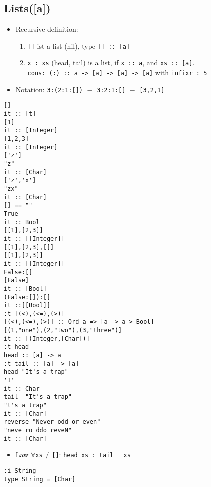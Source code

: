 \documentclass{article}
\newcommand{\Haskell}[1]{\texttt{#1}}
\begin{document}
\begin{enumerate}
\end{enumerate}
\subsection{Lists([a])}
\begin{itemize}
\item Recursive definition:
\begin{enumerate}
\item\Haskell{[]} ist a list (nil), type \Haskell{[] :: [a]}
\item\Haskell{x : xs} (head, tail) is a list, if \Haskell{x :: a}, and \Haskell{xs :: [a]}.\\
\phantom{ }\quad \Haskell{cons: (:) :: a -> [a] -> [a] -> [a]} with \Haskell{infixr : 5}
\end{enumerate}
\item Notation: \Haskell{3:(2:1:[])} $\equiv$ \Haskell{3:2:1:[]} $\equiv$ \Haskell{[3,2,1]}
\end{itemize}
\begin{verbatim}
[]
it :: [t]
[1]
it :: [Integer]
[1,2,3]
it :: [Integer]
['z']
"z"
it :: [Char]
['z','x']
"zx"
it :: [Char]
[] == ""
True
it :: Bool
[[1],[2,3]]
it :: [[Integer]]
[[1],[2,3],[]]
[[1],[2,3]]
it :: [[Integer]]
False:[]
[False]
it :: [Bool]
(False:[]):[]
it ::[[Bool]]
:t [(<),(<=),(>)]
[(<),(<=),(>)] :: Ord a => [a -> a-> Bool]
[(1,"one"),(2,"two"),(3,"three")]
it :: [(Integer,[Char])]
:t head
head :: [a] -> a
:t tail :: [a] -> [a]
head "It's a trap"
'I'
it :: Char
tail  "It's a trap"
"t's a trap"
it :: [Char]
reverse "Never odd or even"
"neve ro ddo reveN"
it :: [Char]
\end{verbatim}
\begin{itemize}
\item Law
$\forall $\texttt{xs}$ \ne$\Haskell{[]}: \Haskell{head xs : tail} = \texttt{xs}
\end{itemize}
\begin{verbatim}
:i String
type String = [Char]
\end{verbatim}
\end{document}
